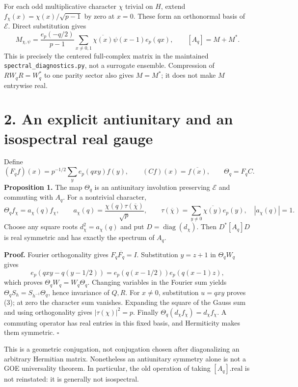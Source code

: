 \documentclass[
  11pt,
]{article}
\begin{document}
For each odd multiplicative character \(\chi\) trivial on \(H\), extend
\(f_\chi(x)=\chi(x)/\sqrt{p-1}\) by zero at \(x=0\). These form an
orthonormal basis of \(\mathcal E\). Direct substitution gives \[
 M_{\chi,\psi}=\frac{e_p(-q/2)}{p-1}
   \sum_{x\ne0,1}\overline{\chi(x)}\psi(x-1)e_p(qx),
 \qquad [A_q]=M+M^*. \tag{2}
\] This is precisely the centered full-complex matrix in the maintained
\texttt{spectral\_diagnostics.py}, not a surrogate ensemble. Compression
of \(RW_qR=W_q^*\) to one parity sector also gives \(M=M^*\); it does
not make \(M\) entrywise real.

\hypertarget{an-explicit-antiunitary-and-an-isospectral-real-gauge}{%
\section{2. An explicit antiunitary and an isospectral real
gauge}\label{an-explicit-antiunitary-and-an-isospectral-real-gauge}}

Define \[
 (F_qf)(x)=p^{-1/2}\sum_y e_p(qxy)f(y),\qquad
 (Cf)(x)=\overline{f(x)},\qquad \Theta_q=F_qC.
\] \textbf{Proposition 1.} The map \(\Theta_q\) is an antiunitary
involution preserving \(\mathcal E\) and commuting with \(A_q\). For a
nontrivial character, \[
 \Theta_q f_\chi=a_\chi(q)f_\chi,\qquad
 a_\chi(q)=\frac{\chi(q)\tau(\overline\chi)}{\sqrt p},\qquad
 \tau(\overline\chi)=\sum_{y\ne0}\overline{\chi(y)}e_p(y),
 \quad |a_\chi(q)|=1. \tag{3}
\] Choose any square roots \(d_\chi^2=a_\chi(q)\) and put
\(D=\operatorname{diag}(d_\chi)\). Then \(D^*[A_q]D\) is real symmetric
and has exactly the spectrum of \(A_q\).

\textbf{Proof.} Fourier orthogonality gives \(F_q\overline{F_q}=I\).
Substitution \(y=z+1\) in \(\Theta_qW_q\) gives \[
 e_p(qxy-q(y-1/2))=e_p(q(x-1/2))e_p(q(x-1)z),
\] which proves \(\Theta_qW_q=W_q\Theta_q\). Changing variables in the
Fourier sum yields \(\Theta_qS_h=S_{h^{-1}}\Theta_q\), hence invariance
of \(Q,R\). For \(x\ne0\), substitution \(u=qxy\) proves (3); at zero
the character sum vanishes. Expanding the square of the Gauss sum and
using orthogonality gives \(|\tau(\chi)|^2=p\). Finally
\(\Theta_q(d_\chi f_\chi)=d_\chi f_\chi\). A commuting operator has real
entries in this fixed basis, and Hermiticity makes them symmetric.
\(\square\)

This is a geometric conjugation, not conjugation chosen after
diagonalizing an arbitrary Hermitian matrix. Nonetheless an antiunitary
symmetry alone is not a GOE universality theorem. In particular, the old
operation of taking \([A_q].\mathrm{real}\) is not reinstated: it is
generally not isospectral.
\end{document}
